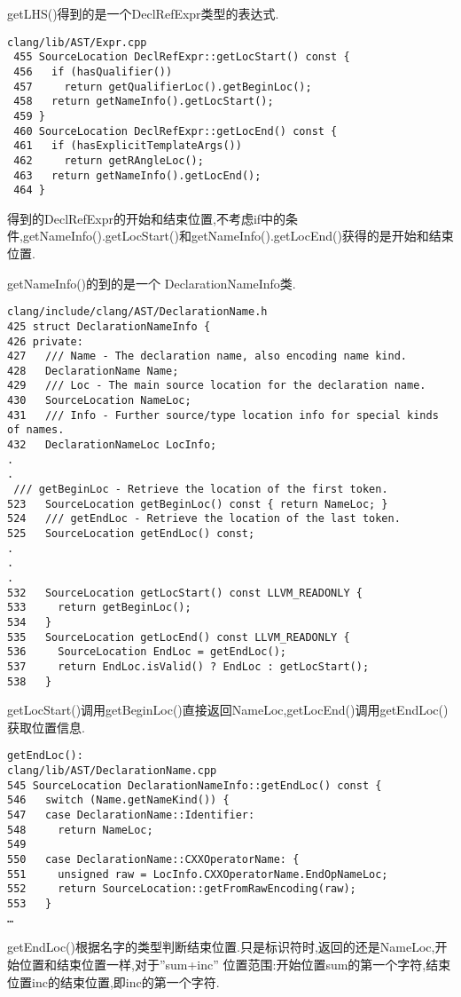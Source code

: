 getLHS()得到的是一个DeclRefExpr类型的表达式.
\begin{lstlisting}
clang/lib/AST/Expr.cpp
 455 SourceLocation DeclRefExpr::getLocStart() const {
 456   if (hasQualifier())
 457     return getQualifierLoc().getBeginLoc();
 458   return getNameInfo().getLocStart();
 459 }
 460 SourceLocation DeclRefExpr::getLocEnd() const {
 461   if (hasExplicitTemplateArgs())
 462     return getRAngleLoc();
 463   return getNameInfo().getLocEnd();
 464 }
\end{lstlisting}

\par{得到的DeclRefExpr的开始和结束位置,不考虑if中的条件,getNameInfo().getLocStart()和getNameInfo().getLocEnd()获得的是开始和结束位置.}

\par{getNameInfo()的到的是一个 DeclarationNameInfo类.}
\begin{lstlisting}
clang/include/clang/AST/DeclarationName.h
425 struct DeclarationNameInfo {
426 private:
427   /// Name - The declaration name, also encoding name kind.
428   DeclarationName Name;
429   /// Loc - The main source location for the declaration name.
430   SourceLocation NameLoc;
431   /// Info - Further source/type location info for special kinds of names.
432   DeclarationNameLoc LocInfo;
.
.
 /// getBeginLoc - Retrieve the location of the first token.
523   SourceLocation getBeginLoc() const { return NameLoc; }
524   /// getEndLoc - Retrieve the location of the last token.
525   SourceLocation getEndLoc() const;
.
.
.
532   SourceLocation getLocStart() const LLVM_READONLY {
533     return getBeginLoc();
534   }
535   SourceLocation getLocEnd() const LLVM_READONLY {
536     SourceLocation EndLoc = getEndLoc();
537     return EndLoc.isValid() ? EndLoc : getLocStart();
538   }
\end{lstlisting}
\par{getLocStart()调用getBeginLoc()直接返回NameLoc,getLocEnd()调用getEndLoc()获取位置信息.}
\begin{lstlisting}
getEndLoc():
clang/lib/AST/DeclarationName.cpp
545 SourceLocation DeclarationNameInfo::getEndLoc() const {
546   switch (Name.getNameKind()) {
547   case DeclarationName::Identifier:
548     return NameLoc;
549 
550   case DeclarationName::CXXOperatorName: {
551     unsigned raw = LocInfo.CXXOperatorName.EndOpNameLoc;
552     return SourceLocation::getFromRawEncoding(raw);
553   }
…
\end{lstlisting}
\par{getEndLoc()根据名字的类型判断结束位置.只是标识符时,返回的还是NameLoc,开始位置和结束位置一样,对于”sum+inc” 位置范围:开始位置sum的第一个字符,结束位置inc的结束位置,即inc的第一个字符.}
